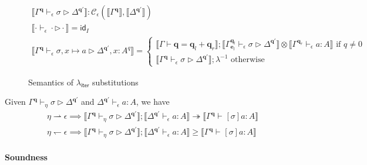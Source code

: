 \documentclass[acmsmall,screen,review]{acmart}
\newcommand{\mc}[1]{\ensuremath{\mathcal{#1}}}
\newcommand{\mb}[1]{\ensuremath{\mathbf{#1}}}
\newcommand{\ms}[1]{\ensuremath{\mathsf{#1}}}
\newcommand{\qsp}[4]{#1 \vdash #2 = #3 + #4}
\newcommand{\hasty}[4]{#1 \vdash_{#2} #3: {#4}}
\newcommand{\issubst}[4]{#1 \vdash_{#2} #3 \rhd #4}
\newcommand{\cref}{\twoheadrightarrow}
\newcommand{\dnt}[1]{\llbracket{#1}\rrbracket}
\newcommand{\subiterexp}{\texorpdfstring{\(\lambda_{\ms{iter}}\)}{lambda-iter}}
\newcommand{\rightmove}{\rightharpoonup}
\newcommand{\leftmove}{\leftharpoondown}
\begin{document}
\begin{figure}
  \begin{gather*}
    \boxed{\dnt{\issubst{\Gamma^{\mb{q}}}{\epsilon}{\sigma}{\Delta^{\mb{q}'}}}
      : \mc{C}_\epsilon(\dnt{\Gamma^{\mb{q}}}, \dnt{\Delta^{\mb{q}'}})} \\
    \dnt{\issubst{\cdot}{\epsilon}{\cdot}{\cdot}} = \ms{id}_I
    \\
    \dnt{\issubst{\Gamma^{\mb{q}}}{\epsilon}{\sigma, x \mapsto a}{\Delta^{\mb{q}'}, x : A^q}}
    = \begin{cases}
      \dnt{\qsp{\Gamma}{\mb{q}}{\mb{q}_l}{\mb{q}_r}} 
      ; \dnt{\issubst{\Gamma^{\mb{q}_l}_{\mb{e}_l}}{\epsilon}{\sigma}{\Delta^{\mb{q}'}}}
      \otimes \dnt{\hasty{\Gamma^{\mb{q}_r}}{\epsilon}{a}{A}}
      \text{ if } q \neq 0 \\
      \dnt{\issubst{\Gamma^{\mb{q}}}{\epsilon}{\sigma}{\Delta^{\mb{q}'}}}
      ; \lambda^{-1} \text{ otherwise}
    \end{cases}
  \end{gather*}
  \caption{Semantics of \subiterexp{} substitutions}
  \Description{}
  \label{fig:subst-den}
\end{figure}

\begin{theorem}
  Given $\issubst{\Gamma^{\mb{q}}}{\eta}{\sigma}{\Delta^{\mb{q'}}}$ and
  $\hasty{\Delta^{\mb{q}'}}{\epsilon}{a}{A}$, we have
  \begin{align*}
  \eta \rightmove \epsilon \implies
  \dnt{\issubst{\Gamma^{\mb{q}}}{\eta}{\sigma}{\Delta^{\mb{q'}}}} 
    ; \dnt{\hasty{\Delta^{\mb{q}'}}{\epsilon}{a}{A}}
  \cref \dnt{\hasty{\Gamma^{\mb{q}}}{}{[\sigma]a}{A}} \\
  \eta \leftmove \epsilon \implies
  \dnt{\issubst{\Gamma^{\mb{q}}}{\eta}{\sigma}{\Delta^{\mb{q'}}}} 
    ; \dnt{\hasty{\Delta^{\mb{q}'}}{\epsilon}{a}{A}}
  \geq \dnt{\hasty{\Gamma^{\mb{q}}}{}{[\sigma]a}{A}}
  \end{align*}
\end{theorem}

\paragraph{Soundness}
\end{document}
